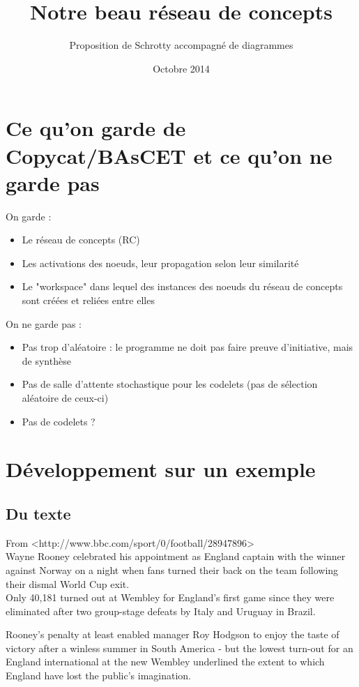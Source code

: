 \documentclass{article}           %
\title{Notre beau réseau de concepts}     %
\author{Proposition de Schrotty accompagné de diagrammes}        %
\date{Octobre 2014}
\begin{document}
\maketitle

\section{Ce qu'on garde de Copycat/BAsCET et ce qu'on ne garde pas}

On garde :
\begin{itemize}
 \item Le réseau de concepts (RC)
 \item Les activations des noeuds, leur propagation selon leur similarité
 \item Le "workspace" dans lequel des instances des noeuds du réseau de concepts sont créées et reliées entre elles
\end{itemize}

On ne garde pas :
\begin{itemize}
 \item Pas trop d'aléatoire : le programme ne doit pas faire preuve d'initiative, mais de synthèse
 \item Pas de salle d'attente stochastique pour les codelets (pas de sélection aléatoire de ceux-ci)
 \item Pas de codelets ?
\end{itemize}


\section{Développement sur un exemple}
\subsection{Du texte}

From <http://www.bbc.com/sport/0/football/28947896>\\

Wayne Rooney celebrated his appointment as England captain with the winner against Norway on a night when fans turned their back on the team following their dismal World Cup exit.\\

Only 40,181 turned out at Wembley for England's first game since they were eliminated after two group-stage defeats by Italy and Uruguay in Brazil.

Rooney's penalty at least enabled manager Roy Hodgson to enjoy the taste of victory after a winless summer in South America - but the lowest turn-out for an England international at the new Wembley underlined the extent to which England have lost the public's imagination.
\end{document}
